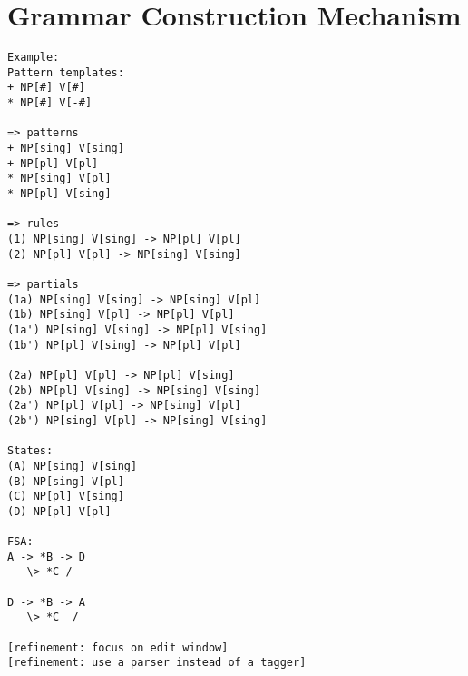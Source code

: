 \documentclass{article}
\begin{document}
\section{Grammar Construction Mechanism}

\begin{verbatim}
Example:
Pattern templates:
+ NP[#] V[#]
* NP[#] V[-#]

=> patterns
+ NP[sing] V[sing]
+ NP[pl] V[pl]
* NP[sing] V[pl]
* NP[pl] V[sing]

=> rules
(1) NP[sing] V[sing] -> NP[pl] V[pl]
(2) NP[pl] V[pl] -> NP[sing] V[sing]

=> partials
(1a) NP[sing] V[sing] -> NP[sing] V[pl]
(1b) NP[sing] V[pl] -> NP[pl] V[pl]
(1a') NP[sing] V[sing] -> NP[pl] V[sing]
(1b') NP[pl] V[sing] -> NP[pl] V[pl]

(2a) NP[pl] V[pl] -> NP[pl] V[sing]
(2b) NP[pl] V[sing] -> NP[sing] V[sing]
(2a') NP[pl] V[pl] -> NP[sing] V[pl]
(2b') NP[sing] V[pl] -> NP[sing] V[sing]

States:
(A) NP[sing] V[sing]
(B) NP[sing] V[pl]
(C) NP[pl] V[sing]
(D) NP[pl] V[pl]

FSA:
A -> *B -> D
   \> *C /

D -> *B -> A
   \> *C  /

[refinement: focus on edit window]
[refinement: use a parser instead of a tagger]
\end{verbatim}
\end{document}
